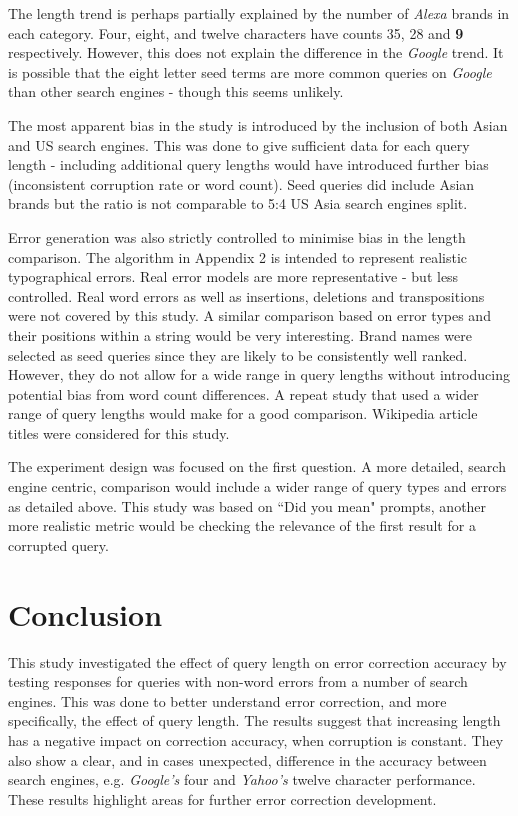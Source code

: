 \documentclass{csfourzero}
\begin{document}
The length trend is perhaps partially explained by the number of \textit{Alexa} brands in each category. Four, eight, and twelve characters have counts 35, 28 and \textbf{9} respectively. However, this does not explain the difference in the \textit{Google} trend. It is possible that the eight letter seed terms are more common queries on \textit{Google} than other search engines - though this seems unlikely.

The most apparent bias in the study is introduced by the inclusion of both Asian and US search engines. This was done to give sufficient data for each query length - including additional query lengths would have introduced further bias (inconsistent corruption rate or word count). Seed queries did include Asian brands but the ratio is not comparable to 5:4 US Asia search engines split.

Error generation was also strictly controlled to minimise bias in the length comparison. The algorithm in Appendix 2 is intended to represent realistic typographical errors. Real error models are more representative - but less controlled. Real word errors as well as insertions, deletions and transpositions were not covered by this study. A similar comparison based on error types and their positions within a string would be very interesting. Brand names were selected as seed queries since they are likely to be consistently well ranked. However, they do not allow for a wide range in query lengths without introducing potential bias from word count differences. A repeat study that used a wider range of query lengths would make for a good comparison. Wikipedia article titles were considered for this study.

The experiment design was focused on the first question. A more detailed, search engine centric, comparison would include a wider range of query types and errors as detailed above. This study was based on ``Did you mean" prompts, another more realistic metric would be checking the relevance of the first result for a corrupted query.

\section{Conclusion}
\label{sec:conc}

This study investigated the effect of query length on error correction accuracy by testing responses for queries with non-word errors from a number of search engines. This was done to better understand error correction, and more specifically, the effect of query length. The results suggest that increasing length has a negative impact on correction accuracy, when corruption is constant. They also show a clear, and in cases unexpected, difference in the accuracy between search engines, e.g. \textit{Google's} four and \textit{Yahoo's} twelve character performance. These results highlight areas for further error correction development.
\end{document}

